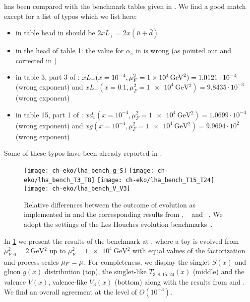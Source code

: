 \eko{} has been compared with the benchmark tables
given in \cite{Giele:2002hx,Dittmar:2005ed}.
We find a good match except for a list of typos which we list here:
\begin{itemize}
    \item in table head in \cite{Giele:2002hx} should be $2xL_+ = 2x(\bar u + \bar d)$
    \item in the head of table 1: the value for $\alpha_s$ in \ffns{} is wrong (as pointed out and corrected in \cite{Dittmar:2005ed})
    \item in table 3, part 3 of \cite{Giele:2002hx}: $xL_-(x=10^{-4}, \muF^2 = \SI{1e4}{\GeV^2})=1.0121\cdot 10^{-4}$ (wrong exponent) and
          $xL_-(x=0.1, \mu_F^2 = \SI{1e4}{\GeV^2})=9.8435\cdot 10^{-3}$ (wrong exponent)
    \item in table 15, part 1 of \cite{Dittmar:2005ed}: $xd_v(x=10^{-4}, \mu_F^2 = \SI{1e4}{\GeV^2}) = 1.0699\cdot 10^{-4}$ (wrong exponent) and
          $xg(x=10^{-4}, \mu_F^2 = \SI{1e4}{\GeV^2}) = 9.9694\cdot 10^{2}$ (wrong exponent)
\end{itemize}
Some of these typos have been already reported in \cite{Diehl:2021gvs}.

\begin{figure}
    \centering
    \texttt{[image: ch-eko/lha\_bench\_g\_S]}
    \texttt{[image: ch-eko/lha\_bench\_T3\_T8]}
    \texttt{[image: ch-eko/lha\_bench\_T15\_T24]}
    \texttt{[image: ch-eko/lha\_bench\_V\_V3]}
    \caption{Relative differences between 
        the outcome of \nnlo{} \qcd{} evolution
        as implemented in \eko{} and the
        corresponding results from \cite{Dittmar:2005ed}, \apfel{}~\cite{Bertone:2013vaa} and \pegasus{}~\cite{Vogt:2004ns}.
        We adopt the settings of the Les Houches \pdf{} evolution benchmarks~\cite{Giele:2002hx,Dittmar:2005ed}.}
    \label{fig:LHAbench}
\end{figure}

In \cref{fig:LHAbench} we present the results of the \vfns{} benchmark at
\nnlo{}, where a toy \pdf{} is evolved from $\mu_{F,0}^2=\SI{2}{\GeV^2}$ up to
$\mu_{F}^2=\SI{1e4}{\GeV^2}$ with equal values of the factorization and process
scales $\mu_F=\mu$.
For completeness, we display the singlet $S(x)$ and gluon $g(x)$ distribution
(top), the singlet-like $T_{3,8,15,24}(x)$ (middle) and the valence $V(x)$,
valence-like $V_{3}(x)$ (bottom) along with the results from \apfel{} and
\pegasus{}. We find an overall agreement at the level of $O(10^{-3})$.
